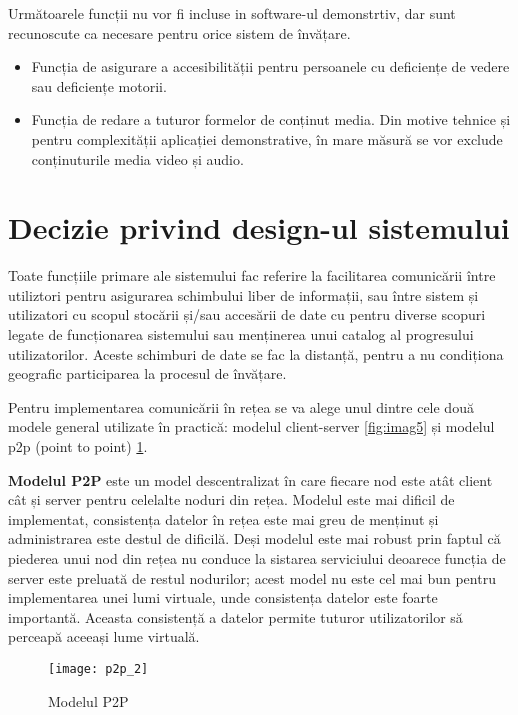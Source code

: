 \par Următoarele funcții nu vor fi incluse in software-ul demonstrtiv, dar sunt recunoscute ca necesare pentru orice sistem de învățare.

\begin{itemize}
\item Funcția de asigurare a accesibilității pentru persoanele cu deficiențe de vedere sau deficiențe motorii.
\item Funcția de redare a tuturor formelor de conținut media. Din motive tehnice și pentru complexității aplicației demonstrative, în mare măsură se vor exclude conținuturile media video și audio.
\end{itemize}

\section{Decizie privind design-ul sistemului}

\par Toate funcțiile primare ale sistemului fac referire la facilitarea comunicării între utiliztori pentru asigurarea schimbului liber de informații, sau între sistem și utilizatori cu scopul stocării și/sau accesării de date cu pentru diverse scopuri legate de funcționarea sistemului sau menținerea unui catalog al progresului utilizatorilor. Aceste schimburi de date se fac la distanță, pentru a nu condiționa geografic participarea la procesul de învățare.
\par Pentru implementarea comunicării în rețea se va alege unul dintre cele două modele general utilizate în practică: modelul client-server \ref{fig:imag5} și modelul p2p (point to point) \ref{fig:imag4}.

\par \textbf{Modelul P2P} este un model descentralizat în care fiecare nod este atât client cât și server pentru celelalte noduri din rețea. Modelul este mai dificil de implementat, consistența datelor în rețea este mai greu de menținut și administrarea este destul de dificilă. Deși modelul este mai robust prin faptul că piederea unui nod din rețea nu conduce la sistarea serviciului deoarece funcția de server este preluată de restul nodurilor; acest model nu este cel mai bun pentru implementarea unei lumi virtuale, unde consistența datelor este foarte importantă. Aceasta consistență a datelor permite tuturor utilizatorilor să perceapă aceeași lume virtuală. 

\begin{figure}[h]
    \centering
    \texttt{[image: p2p\_2]}
    \caption{Modelul P2P}
    \label{fig:imag4}
\end{figure}

